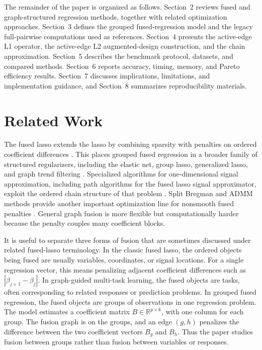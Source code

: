 \documentclass[twoside,11pt]{article}
\newcommand{\R}{\mathbb{R}}
\begin{document}
The remainder of the paper is organized as follows. Section~2 reviews fused
and graph-structured regression methods, together with related optimization
approaches. Section~3 defines the grouped fused-regression model and the
legacy full-pairwise computations used as references. Section~4 presents the
active-edge L1 operator, the active-edge L2 augmented-design construction, and
the chain approximation. Section~5 describes the benchmark protocol, datasets,
and compared methods. Section~6 reports accuracy, timing, memory, and Pareto
efficiency results. Section~7 discusses implications, limitations, and
implementation guidance, and Section~8 summarizes reproducibility materials.

\section{Related Work}

The fused lasso extends the lasso by combining sparsity with penalties on
ordered coefficient differences \citep{tibshirani1996lasso,tibshirani2005fused}.
This places grouped fused regression in a broader family of structured
regularizers, including the elastic net, group lasso, generalized lasso, and
graph trend filtering
\citep{zou2005elastic,yuan2006group,tibshirani2011genlasso,wang2016graphtf}.
Specialized algorithms for one-dimensional signal approximation, including
path algorithms for the fused lasso signal approximator, exploit the ordered
chain structure of that problem \citep{hoefling2010path}. Split Bregman and
ADMM methods provide another important optimization line for nonsmooth fused
penalties \citep{ye2011split,boyd2011admm}. General graph fusion is more
flexible but computationally harder because the penalty couples many
coefficient blocks.

It is useful to separate three forms of fusion that are sometimes discussed under
related fused-lasso terminology. In the classic fused lasso, the ordered
objects being fused are usually variables, coordinates, or signal locations.
For a single regression vector, this means penalizing adjacent coefficient
differences such as $|\beta_{j+1}-\beta_j|$. In graph-guided multi-task
learning, the fused objects are tasks, often corresponding to related
responses or prediction problems. In grouped fused regression, the fused
objects are groups of observations in one regression problem. The model
estimates a coefficient matrix $B\in\R^{p\times k}$, with one column for each
group. The fusion graph is on the groups, and an edge $(g,h)$ penalizes the
difference between the two coefficient vectors $B_g$ and $B_h$. Thus the
paper studies fusion between groups rather than fusion between variables or
responses.
\end{document}
